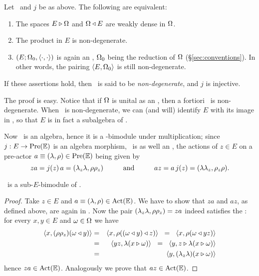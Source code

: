 \begin{lemma} \label{lem:nondeg_context}
  Let\/ \EE\ and $j$ be as above. The following are equivalent:
  \begin{enumerate}
    \item The spaces $E \triangleright \Omega$ and $\Omega \triangleleft E$ are weakly dense in $\Omega$.
    \item The product in $E$ is non-degenerate.
    \item $(E;\Omega_0,\langle\cdot, \cdot\rangle)$ is again an \context, $\Omega_0$ being the reduction of $\Omega$
       \mbox{\rm  (\S \ref{sec:conventions})}.
       In other words, the pairing $\langle E,\Omega_0 \rangle$ is still non-degenerate.
 \end{enumerate}
 If these assertions hold, then \EE\ is said to be {\em non-degenerate}, and $j$ is injective.
\end{lemma}

The proof is easy. Notice that if $\Omega$ is unital as an \Ebimod, then a fortiori
\EE\ is non-degenerate.
When \EE\ is non-degenerate, we can (and will) identify $E$ with its image in \PreE,
so that $E$ is in fact a subalgebra of \PreE\@.

Now \PreE\ is an algebra, hence it is a \PreE-bimodule under multiplication;
since $j:E \rightarrow \mbox{\rm Pre}(\mathbb{E})$ is an algebra morphism, \PreE\ is as well an \Ebimod,
the actions of $z\in E$ on a pre-actor $a\equiv (\lambda,\rho) \in \mbox{\rm Pre}(\mathbb{E})$ being given by
$$ za = j(z)\,a = (\lam_z\lam,\rho\rho_z) \andspace{10mm}
   az = a\,j(z) = (\lam\lam_z,\rho_z\rho). $$

\begin{lemma}  \label{lem:Act_is_submodule}
  \ActE\ is a sub-$E$-bimodule of\/ \PreE.
\end{lemma}
\begin{proof}
  Take $z\in E$ and $a\equiv (\lambda,\rho) \in \mbox{\rm Act}(\mathbb{E})$.
  We have to show that $za$ and $az$, as defined above,
  are again in \ActE\@. Now the pair $(\lambda_z\lambda,\rho\rho_z) = za$
  indeed satisfies the \biap:
  for every $x,y \in E$ and $\omega \in \Omega$ we have
  \begin{eqnarray*}
     \langle x,(\rho\rho_z)(\omega \triangleleft y) \rangle
           &=& \langle x,\rho((\omega\triangleleft y)\triangleleft z) \rangle
           \hspace{0.6em}=\hspace{0.6em}
               \langle x,\rho(\omega\triangleleft yz) \rangle              \\
           &=& \langle yz,\lambda(x\triangleright\omega) \rangle
           \hspace{0.6em}=\hspace{0.6em}
               \langle y,z \triangleright \lambda(x\triangleright\omega) \rangle        \\
           &=& \langle y,(\lambda_z\lambda)(x\triangleright\omega) \rangle
  \end{eqnarray*}
  hence $za \in \mbox{\rm Act}(\mathbb{E})$\@. Analogously we prove that $az \in \mbox{\rm Act}(\mathbb{E})$.
\end{proof}


